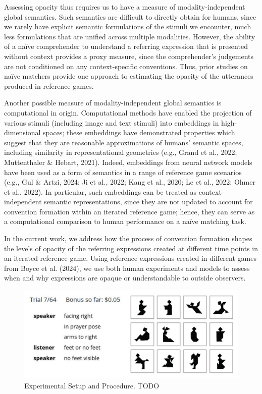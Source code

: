 \documentclass[10pt, letterpaper]{article}
\begin{document}
Assessing opacity thus requires us to have a measure of
modality-independent global semantics. Such semantics are difficult to
directly obtain for humans, since we rarely have explicit semantic
formulations of the stimuli we encounter, much less formulations that
are unified across multiple modalities. However, the ability of a naïve
comprehender to understand a referring expression that is presented
without context provides a proxy measure, since the comprehender's
judgements are not conditioned on any context-specific conventions.
Thus, prior studies on naïve matchers provide one approach to estimating
the opacity of the utterances produced in reference games.

Another possible measure of modality-independent global semantics is
computational in origin. Computational methods have enabled the
projection of various stimuli (including image and text stimuli) into
embeddings in high-dimensional spaces; these embeddings have
demonstrated properties which suggest that they are reasonable
approximations of humans' semantic spaces, including similarity in
representational geometries (e.g., Grand et al., 2022; Muttenthaler \&
Hebart, 2021). Indeed, embeddings from neural network models have been
used as a form of semantics in a range of reference game scenarios
(e.g., Gul \& Artzi, 2024; Ji et al., 2022; Kang et al., 2020; Le et
al., 2022; Ohmer et al., 2022). In particular, such embeddings can be
treated as context-independent semantic representations, since they are
not updated to account for convention formation within an iterated
reference game; hence, they can serve as a computational comparison to
human performance on a naïve matching task.

In the current work, we address how the process of convention formation
shapes the levels of opacity of the referring expressions created at
different time points in an iterated reference game. Using reference
expressions created in different games from Boyce et al. (2024), we use
both human experiments and models to assess when and why expressions are
opaque or understandable to outside observers.

\begin{CodeChunk}
\begin{figure}[t!]

{\centering \includegraphics[width=1\linewidth]{matcher-diagram} 

}

\caption[Experimental Setup and Procedure]{Experimental Setup and Procedure. TODO \label{game}}\label{fig:interface}
\end{figure}
\end{CodeChunk}
\end{document}

